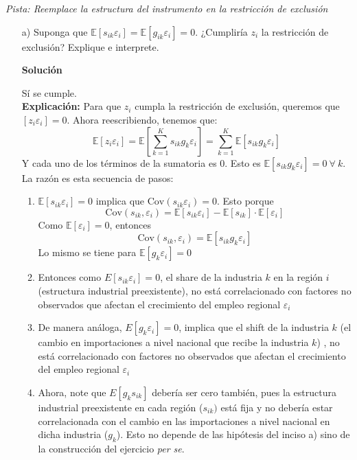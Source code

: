 \documentclass[a4paper, answers, addpoints, 11pt]{exam}
\newenvironment{solucion}{%
  \begin{mdframed}[
    backgroundcolor=blue!5,    %
    linecolor=blue!50,          %
    linewidth=2pt,              %
    leftmargin=10pt,            %
    rightmargin=8pt,           %
    topline=true,              %
    bottomline=true,            %
    roundcorner=10pt,           %
    innerleftmargin=10pt,       %
    innerrightmargin=10pt,      %
    innerbottommargin=10pt,     %
    innertopmargin=10pt         %
  ]%
  \begin{tcolorbox}[colframe=blue!50!black, colback=blue!50, coltitle=white, sharp corners=all, boxrule=1mm, width=\textwidth, halign=left, valign=center, top=0mm, bottom=0mm, left=0mm, right=0mm] \textbf{Solución} \end{tcolorbox} }{\end{mdframed}}
\begin{document}
\begin{enumerate}
        \textit{Pista: Reemplace la estructura del instrumento en la restricción de exclusión}
    \begin{itemize}
         \item[a)] Suponga que $\mathbb{E}[s_{ik} \varepsilon_i]=\mathbb{E}[g_{ik} \varepsilon_i]=0$. ¿Cumpliría $z_i$ la restricción de exclusión? Explique e interprete.
           \begin{solucion}
        Sí se cumple.\\
        
        \textbf{Explicación:} Para que $z_i$ cumpla la restricción de exclusión, queremos que $[z_i \varepsilon_i]=0$. Ahora reescribiendo, tenemos que:
        \begin{equation}\label{exogeneidad3}
    \mathbb{E}[z_i \varepsilon_i] = \mathbb{E} \left[ \sum_{k=1}^K s_{ik} g_k \varepsilon_i \right] = \sum_{k=1}^K \mathbb{E}[s_{ik} g_k \varepsilon_i]
\end{equation}
Y cada uno de los términos de la sumatoria es 0. Esto es $\mathbb{E}[s_{ik} g_k \varepsilon_i]=0 \: \forall \:k.$ La razón es esta secuencia de pasos:
\begin{enumerate}
    \item $\mathbb{E}[s_{ik}  \varepsilon_i] = 0 $ implica que $ \text{Cov}(s_{ik}\varepsilon_i)=0$. Esto porque  \begin{equation*}\text{Cov}(s_{ik}, \varepsilon_i) =
\mathbb{E}[s_{ik} \varepsilon_i] - \mathbb{E}[s_{ik}] \cdot \mathbb{E}[\varepsilon_i]
\end{equation*}
Como  \( \mathbb{E}[\varepsilon_i] = 0 \), entonces 
 \begin{equation*}
        \text{Cov}(s_{ik},  \varepsilon_i) =
\mathbb{E}[s_{ik} g_k \varepsilon_i] 
\end{equation*}
Lo mismo se tiene para $\mathbb{E}[ g_k \varepsilon_i] =0$
    \item Entonces como $E[s_{ik}\varepsilon_i] = 0$, el share de la industria $k$ en la región $i$ (estructura industrial preexistente), no está correlacionado con  factores no observados que afectan el crecimiento del empleo regional $\varepsilon_i$ 
    \item De manera análoga, $E[g_{k}\varepsilon_i] = 0$, implica que el shift de la industria $k$ (el cambio en importaciones a nivel nacional que recibe la industria $k$) , no está correlacionado con  factores no observados que afectan el crecimiento del empleo regional $\varepsilon_i$ 
    \item Ahora,  note que $E[g_{k}s_{ik}]$ debería ser cero también, pues la estructura industrial preexistente en cada región ($s_{ik})$ está fija y no debería estar correlacionada con el cambio en las importaciones a nivel nacional en dicha industria ($g_{k}$). Esto no depende de las hipótesis del inciso a) sino de la construcción del ejercicio \textit{per se}.

\end{enumerate}
\end{solucion}
\end{itemize}
\end{enumerate}
\end{document}
